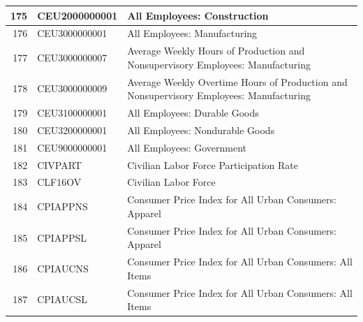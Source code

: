 \documentclass[12pt]{article}
\begin{document}
\begin{table}
\begin{tabular}{rp{5cm}p{11cm}}
  \hline
	175 & CEU2000000001 & All Employees: Construction \\
  \hline
	176 & CEU3000000001 & All Employees: Manufacturing \\
  \hline
	177 & CEU3000000007 & Average Weekly Hours of Production and Nonsupervisory Employees: Manufacturing \\
  \hline
	178 & CEU3000000009 & Average Weekly Overtime Hours of Production and Nonsupervisory Employees: Manufacturing \\
  \hline
	179 & CEU3100000001 & All Employees: Durable Goods \\
  \hline
	180 & CEU3200000001 & All Employees: Nondurable Goods \\
  \hline
	181 & CEU9000000001 & All Employees: Government \\
  \hline
	182 & CIVPART & Civilian Labor Force Participation Rate \\
  \hline
	183 & CLF16OV & Civilian Labor Force \\
  \hline
	184 & CPIAPPNS & Consumer Price Index for All Urban Consumers: Apparel \\
  \hline
	185 & CPIAPPSL & Consumer Price Index for All Urban Consumers: Apparel \\
  \hline
	186 & CPIAUCNS & Consumer Price Index for All Urban Consumers: All Items \\
  \hline
	187 & CPIAUCSL & Consumer Price Index for All Urban Consumers: All Items \\
\end{tabular}
\end{table}
\end{document}
